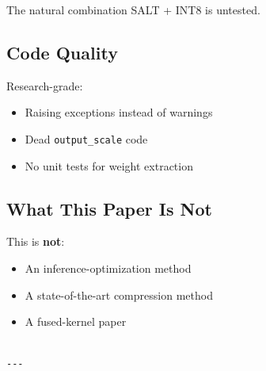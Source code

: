 The natural combination SALT + INT8 is untested.

\subsection{Code Quality}

Research-grade:
\begin{itemize}
\item Raising exceptions instead of warnings
\item Dead \texttt{output\_scale} code
\item No unit tests for weight extraction

\end{itemize}
\subsection{What This Paper Is Not}

This is \textbf{not}:
\begin{itemize}
\item An inference-optimization method
\item A state-of-the-art compression method
\item A fused-kernel paper
\end{itemize}
\begin{lstlisting}

---
\end{lstlisting}